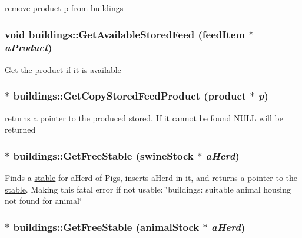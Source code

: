 \label{classbuildings_a6a0123f0dd6ed6d314e11e5b8107baf5}
remove \hyperlink{classproduct}{product} p from \hyperlink{classbuildings}{buildings} \hypertarget{classbuildings_ae8225491bee18bb4647149201b24d8ba}{
\subsubsection[{GetAvailableStoredFeed}]{\setlength{\rightskip}{0pt plus 5cm}void buildings::GetAvailableStoredFeed ({\bf feedItem} $\ast$ {\em aProduct})}}
\label{classbuildings_ae8225491bee18bb4647149201b24d8ba}
Get the \hyperlink{classproduct}{product} if it is available \hypertarget{classbuildings_adea0a6434b66c56d04a52fad0b9b2979}{
\subsubsection[{GetCopyStoredFeedProduct}]{ $\ast$ buildings::GetCopyStoredFeedProduct ({\bf product} $\ast$ {\em p})}}
\label{classbuildings_adea0a6434b66c56d04a52fad0b9b2979}
returns a pointer to the produced stored. If it cannot be found NULL will be returned \hypertarget{classbuildings_a550d0127d0d4c8a4f497b4bc9fb30bcf}{
\subsubsection[{GetFreeStable}]{ $\ast$ buildings::GetFreeStable ({\bf swineStock} $\ast$ {\em aHerd})}}
\label{classbuildings_a550d0127d0d4c8a4f497b4bc9fb30bcf}
Finds a \hyperlink{classstable}{stable} for aHerd of Pigs, inserts aHerd in it, and returns a pointer to the \hyperlink{classstable}{stable}. Making this fatal error if not usable: \char`\"{}buildings: suitable animal housing not found for animal\char`\"{} \hypertarget{classbuildings_ab5f3304118e2662e0e53867aaf99a1dd}{
\subsubsection[{GetFreeStable}]{ $\ast$ buildings::GetFreeStable ({\bf animalStock} $\ast$ {\em aHerd})}}
